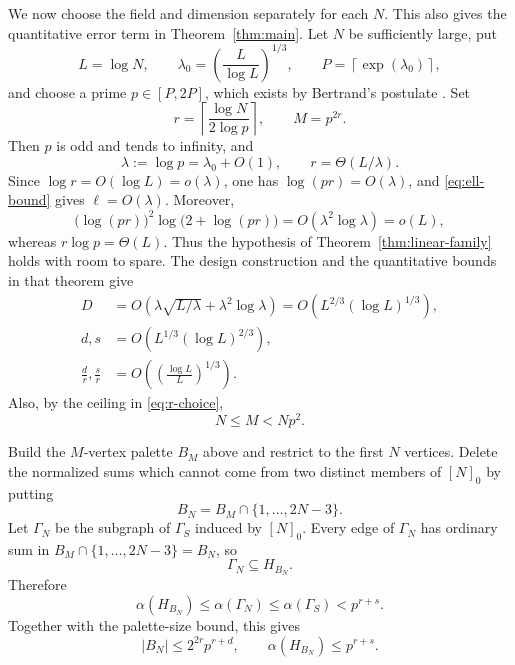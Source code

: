 \documentclass[11pt]{article}
\numberwithin{equation}{section}
\theoremstyle{definition}
\theoremstyle{remark}
\begin{document}
We now choose the field and dimension separately for each $N$.  This
also gives the quantitative error term in Theorem~\ref{thm:main}.  Let
$N$ be sufficiently large, put
\[
 L=\log N,
 \qquad
 \lambda_0=\left(\frac{L}{\log L}\right)^{1/3},
 \qquad
 P=\left\lceil\exp(\lambda_0)\right\rceil,
\]
and choose a prime $p\in[P,2P]$, which exists by Bertrand's postulate
\cite{HardyWright2008}.
Set
\begin{equation}\label{eq:r-choice}
 r=\left\lceil\frac{\log N}{2\log p}\right\rceil,
 \qquad M=p^{2r}.
\end{equation}
Then $p$ is odd and tends to infinity, and
\[
 \lambda:=\log p=\lambda_0+O(1),
 \qquad
 r=\Theta(L/\lambda).
\]
Since $\log r=O(\log L)=o(\lambda)$, one has
$\log(pr)=O(\lambda)$, and \eqref{eq:ell-bound} gives
$\ell=O(\lambda)$.  Moreover,
\[
 \bigl(\log(pr)\bigr)^2\log\bigl(2+\log(pr)\bigr)
 =O(\lambda^2\log\lambda)=o(L),
\]
whereas $r\log p=\Theta(L)$.  Thus the hypothesis of
Theorem~\ref{thm:linear-family} holds with room to spare.
The design construction and the quantitative bounds in that theorem give
\[
 \begin{aligned}
 D
 &=O\left(\lambda\sqrt{L/\lambda}
          +\lambda^2\log\lambda\right)
  =O\left(L^{2/3}(\log L)^{1/3}\right),\\
 d,s
 &=O\left(L^{1/3}(\log L)^{2/3}\right),\\
 \frac dr,\frac sr
 &=O\left(\left(\frac{\log L}{L}\right)^{1/3}\right).
 \end{aligned}
\]
Also, by the ceiling in \eqref{eq:r-choice},
\[
 N\le M<Np^2.
\]

Build the $M$-vertex palette $B_M$ above and restrict to the first $N$
vertices.  Delete the normalized sums which cannot come from two distinct
members of $[N]_0$ by putting
\begin{equation}\label{eq:BN}
 B_N=B_M\cap\{1,\ldots,2N-3\}.
\end{equation}
Let $\Gamma_N$ be the subgraph of $\Gamma_S$ induced by $[N]_0$.  Every edge of
$\Gamma_N$ has ordinary sum in
$B_M\cap\{1,\ldots,2N-3\}=B_N$, so
\[
 \Gamma_N\subseteq H_{B_N}.
\]
Therefore
\[
 \alpha(H_{B_N})\le\alpha(\Gamma_N)
 \le\alpha(\Gamma_S)<p^{r+s}.
\]
Together with the palette-size bound, this gives
\[
 |B_N|\le2^{2r}p^{r+d},
 \qquad
 \alpha(H_{B_N})\le p^{r+s}.
\]
\end{document}
